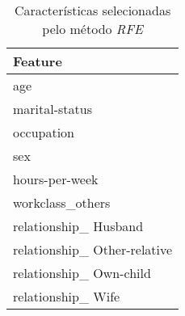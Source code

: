 \begin{table}
\centering
\caption{Características selecionadas pelo método \textit{RFE}}
\begin{tabular}{l}
\toprule
                      Feature \\
\midrule
                          age \\
               marital-status \\
                   occupation \\
                          sex \\
               hours-per-week \\
             workclass\_others \\
        relationship\_ Husband \\
 relationship\_ Other-relative \\
      relationship\_ Own-child \\
           relationship\_ Wife \\
\bottomrule
\end{tabular}
\end{table}
